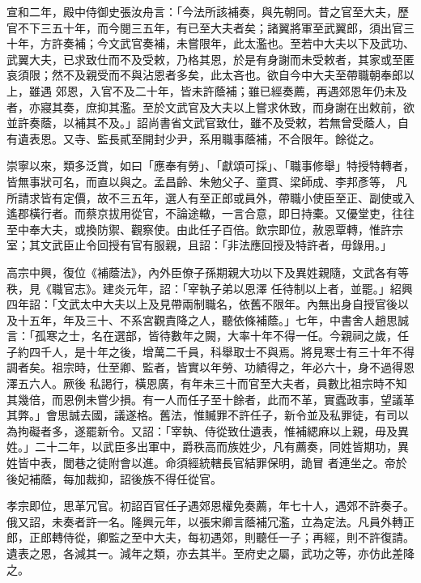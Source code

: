 \begin{pinyinscope}
 宣和二年，殿中侍御史張汝舟言：「今法所該補奏，與先朝同。昔之官至大夫，歷官不下三五十年，而今閱三五年，有已至大夫者矣；諸翼將軍至武翼郎，須出官三十年，方許奏補；今文武官奏補，未嘗限年，此太濫也。至若中大夫以下及武功、武翼大夫，已求致仕而不及受敕，乃格其恩，於是有身謝而未受敕者，其家或至匿哀須限；然不及親受而不與沾恩者多矣，此太吝也。欲自今中大夫至帶職朝奉郎以上，雖遇
 郊恩，入官不及二十年，皆未許蔭補；雖已經奏薦，再遇郊恩年仍未及者，亦寢其奏，庶抑其濫。至於文武官及大夫以上嘗求休致，而身謝在出敕前，欲並許奏蔭，以補其不及。」詔尚書省文武官致仕，雖不及受敕，若無曾受蔭人，自有遺表恩。又寺、監長貳至開封少尹，系用職事蔭補，不合限年。餘從之。



 崇寧以來，類多泛賞，如曰「應奉有勞」、「獻頌可採」、「職事修舉」特授特轉者，皆無事狀可名，而直以與之。孟昌齡、朱勉父子、童貫、梁師成、李邦彥等，
 凡所請求皆有定價，故不三五年，選人有至正郎或員外，帶職小使臣至正、副使或入遙郡橫行者。而蔡京拔用從官，不論途轍，一言合意，即日持橐。又優堂吏，往往至中奉大夫，或換防禦、觀察使。由此任子百倍。飲宗即位，赦恩覃轉，惟許宗室；其文武臣止令回授有官有服親，且詔：「非法應回授及特許者，毋錄用。」



 高宗中興，復位《補蔭法》，內外臣僚子孫期親大功以下及異姓親隨，文武各有等秩，見《職官志》。建炎元年，詔：「宰執子弟以恩澤
 任待制以上者，並罷。」紹興四年詔：「文武太中大夫以上及見帶兩制職名，依舊不限年。內無出身自授官後以及十五年，年及三十、不系宮觀責降之人，聽依條補蔭。」七年，中書舍人趙思誠言：「孤寒之士，名在選部，皆待數年之闕，大率十年不得一任。今親祠之歲，任子約四千人，是十年之後，增萬二千員，科舉取士不與焉。將見寒士有三十年不得調者矣。祖宗時，仕至卿、監者，皆實以年勞、功績得之，年必六十，身不過得恩澤五六人。厥後
 私謁行，橫恩廣，有年未三十而官至大夫者，員數比祖宗時不知其幾倍，而恩例未嘗少損。有一人而任子至十餘者，此而不革，實蠹政事，望議革其弊。」會思誠去國，議遂格。舊法，惟贓罪不許任子，新令並及私罪徒，有司以為拘礙者多，遂罷新令。又詔：「宰執、侍從致仕遺表，惟補緦麻以上親，毋及異姓。」二十二年，以武臣多出軍中，爵秩高而族姓少，凡有薦奏，同姓皆期功，異姓皆中表，閭巷之徒附會以進。命須經統轄長官結罪保明，詭冒
 者連坐之。帝於後妃補蔭，每加裁抑，詔後族不得任從官。



 孝宗即位，思革冗官。初詔百官任子遇郊恩權免奏薦，年七十人，遇郊不許奏子。俄又詔，未奏者許一名。隆興元年，以張宋卿言蔭補冗濫，立為定法。凡員外轉正郎，正郎轉侍從，卿監之至中大夫，每初遇郊，則聽任一子；再經，則不許復請。遺表之恩，各減其一。減年之類，亦去其半。至府史之屬，武功之等，亦仿此差降之。




\end{pinyinscope}
